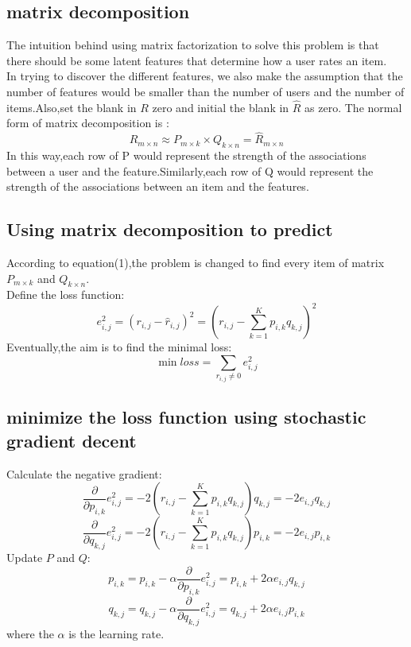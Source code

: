\documentclass[journal, a4paper]{IEEEtran}
\begin{document}
\subsection{matrix decomposition}
The intuition behind using matrix factorization to solve this problem is that there should be some latent features that determine how a user rates an item.\\
In trying to discover the different features, we also make the assumption that the number of features would be smaller than the number of users and the number of items.Also,set the blank in $R$ zero and initial the blank in $\hat{R}$ as zero.
The normal form of matrix decomposition is :
\begin{equation}
R_{m\times n}\approx P_{m\times k}\times Q_{k\times n}=\hat{R}_{m\times n}
\end{equation}
In this way,each row of P would represent the strength of the associations between a user and the feature.Similarly,each row of Q would represent the strength of the associations between an item and the features.

\subsection{Using matrix decomposition to predict }
According to equation(1),the problem is changed to find every item of matrix $P_{m\times k}$ and $Q_{k\times n}$.\\
Define the loss function:
\begin{equation}
e_{i,j}^{2}=(r_{i,j}-\hat{r}_{i,j})^{2}=(r_{i,j}-\sum_{k=1}^{K}p_{i,k}q_{k,j})^{2}
\end{equation}
Eventually,the aim is to find the minimal loss:
\begin{equation}
\min loss=\sum_{r_{i,j}\neq 0}e_{i,j}^{2}
\end{equation}
\subsection{minimize the loss function using stochastic gradient decent}
Calculate the negative gradient:
\begin{equation}
\dfrac{\partial}{\partial p_{i,k}}e_{i,j}^{2}=-2(r_{i,j}-\sum_{k=1}^{K}p_{i,k}q_{k,j})q_{k,j}=-2e_{i,j}q_{k,j}
\end{equation}
\begin{equation}
\dfrac{\partial}{\partial q_{k,j}}e_{i,j}^{2}=-2(r_{i,j}-\sum_{k=1}^{K}p_{i,k}q_{k,j})p_{i,k}=-2e_{i,j}p_{i,k}
\end{equation}
Update $P$ and $Q$:
\begin{equation}
p_{i,k}=p_{i,k}-\alpha\dfrac{\partial}{\partial p_{i,k}}e_{i,j}^{2}=p_{i,k}+2\alpha e_{i,j}q_{k,j}
\end{equation}
\begin{equation}
q_{k,j}=q_{k,j}-\alpha\dfrac{\partial}{\partial q_{k,j}}e_{i,j}^{2}=q_{k,j}+2\alpha e_{i,j}p_{i,k}
\end{equation}
where the $\alpha$ is the learning rate.
\end{document}
